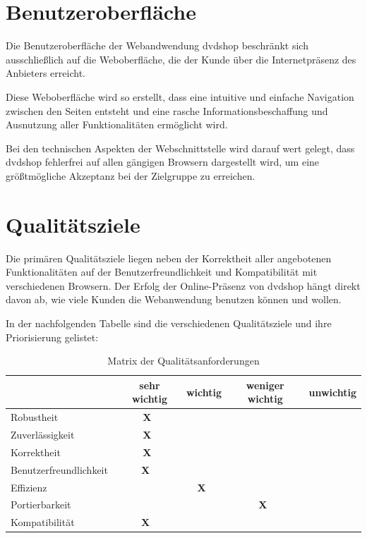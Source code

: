 \documentclass[12pt,oneside,a4paper,bibtotoc,liststotoc,pointlessnumbers]{scrartcl}
\begin{document}
\newpage
\section{Benutzeroberfläche}
Die Benutzeroberfläche der Webandwendung dvdshop beschränkt sich ausschließlich auf die Weboberfläche, die der Kunde über die Internetpräsenz des Anbieters erreicht.\par
Diese Weboberfläche wird so erstellt, dass eine intuitive und einfache Navigation zwischen den Seiten entsteht und eine rasche Informationsbeschaffung und Ausnutzung aller Funktionalitäten ermöglicht wird.\par
Bei den technischen Aspekten der Webschnittstelle wird darauf wert gelegt, dass dvdshop fehlerfrei auf allen gängigen Browsern dargestellt wird, um eine größtmögliche Akzeptanz bei der Zielgruppe zu erreichen.

\newpage
\section{Qualitätsziele}
Die primären Qualitätsziele liegen neben der Korrektheit aller angebotenen Funktionalitäten auf der Benutzerfreundlichkeit und Kompatibilität mit verschiedenen Browsern. Der Erfolg der Online-Präsenz von dvdshop hängt direkt davon ab, wie viele Kunden die Webanwendung benutzen können und wollen.\par
In der nachfolgenden Tabelle sind die verschiedenen Qualitätsziele und ihre Priorisierung gelistet:
\begin{table}[h]							
\begin{center}
 \begin{tabular}{l|c|c|c|c}
  ~ & sehr wichtig & wichtig & weniger wichtig & unwichtig\\
  \hline \hline
  Robustheit~ & \textbf{X}~ &  ~ ~ ~ &  ~ ~ ~ &  ~ ~ ~ \\
  \hline
  Zuverlässigkeit~ & \textbf{X}~ &  ~ ~ ~ &  ~ ~ ~ &  ~ ~ ~ \\
  \hline
  Korrektheit~ & \textbf{X}~ &  ~ ~ ~ &  ~ ~ ~ &  ~ ~ ~ \\
  \hline
  Benutzerfreundlichkeit~ &  \textbf{X} ~ & ~ ~ ~ &  ~ ~ ~ &  ~ ~ ~ \\
  \hline
  Effizienz~ &  ~ ~ ~ & \textbf{X}~ &  ~ ~ ~ &  ~ ~ ~ \\
  \hline
  Portierbarkeit~ &  ~ ~ ~ &  ~ ~ ~ & \textbf{X}~ &  ~ ~ ~ \\
  \hline
  Kompatibilität~ &  \textbf{X} ~ &  ~ ~ ~ & ~ ~ ~ &  ~ ~ ~ \\
 \end{tabular}
\end{center}
\caption{Matrix der Qualitätsanforderungen}									%
\label{fig:Qualitaet}												%
\end{table}
\end{document}
